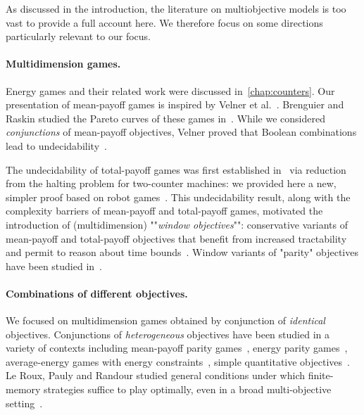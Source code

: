 As discussed in the introduction, the literature on multiobjective models is too vast to provide a full account here. We therefore focus on some directions particularly relevant to our focus.

\paragraph{Multidimension games.} Energy games and their related work were discussed in~\cref{chap:counters}. Our presentation of mean-payoff games is inspired by Velner et al.~\cite{Velner&al:2015}. Brenguier and Raskin studied the Pareto curves of these games in~\cite{Brenguier&Raskin:2015}. While we considered \textit{conjunctions} of mean-payoff objectives, Velner proved that Boolean combinations lead to undecidability~\cite{Velner:2015}.

The undecidability of total-payoff games was first established in~\cite{Chatterjee&al:2015} via reduction from the halting problem for two-counter machines: we provided here a new, simpler proof based on robot games~\cite{Niskanen&Potapov&Reichert:2016}. This undecidability result, along with the complexity barriers of mean-payoff and total-payoff games, motivated the introduction of (multidimension) ""\textit{window objectives}"": conservative variants of mean-payoff and total-payoff objectives that benefit from increased tractability and permit to reason about time bounds~\cite{Chatterjee&al:2015}. Window variants of "parity" objectives have been studied in~\cite{Bruyere&Hautem&Randour:2016}.

\paragraph{Combinations of different objectives.} We focused on multidimension games obtained by conjunction of \textit{identical} objectives. Conjunctions of \textit{heterogeneous} objectives have been studied in a variety of contexts including mean-payoff parity games~\cite{Chatterjee&Henzinger&Jurdzinski:2005,Daviaud&Jurdzinski&Lazic:2018}, energy parity games~\cite{Chatterjee&Doyen:2012,Chatterjee&Randour&Raskin:2014}, average-energy games with energy constraints~\cite{Bouyer&al:2018,Bouyer&al:2017}, simple quantitative objectives~\cite{Bruyere&Hautem&Raskin:2016}. Le Roux, Pauly and Randour studied general conditions under which finite-memory strategies suffice to play optimally, even in a broad multi-objective setting~\cite{LeRoux&Pauly&Randour:2018}.


